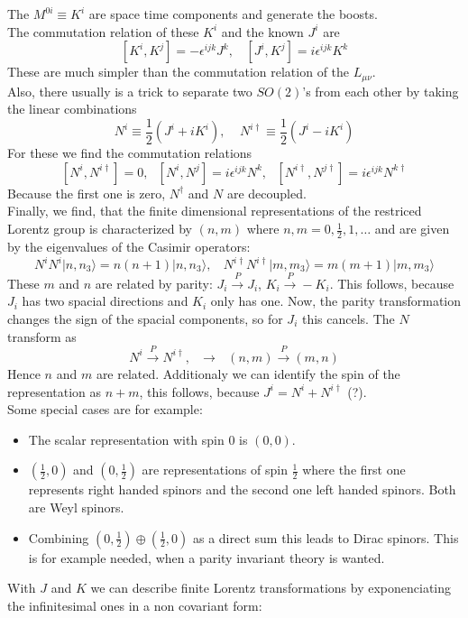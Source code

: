\documentclass{include/thesisclass}
\newcommand{\rk}{\rangle}
\newcommand{\df}{\rightarrow}
\newcommand{\eps}{\epsilon}
\begin{document}
The $M^{0i} \equiv K^i$ are space time components and generate the boosts.\\
The commutation relation of these $K^i$ and the known $J^i$ are
\[ [K^i, K^j] = - \eps^{ijk} J^k, ~~~~ [J^i, K^j] = i \eps^{ijk} K^k\]
These are much simpler than the commutation relation of the $L_{\mu\nu}$.\\
Also, there usually is a trick to separate two $SO(2)$'s from each other by taking the linear combinations
\[N^i \equiv \frac{1}{2}(J^i + i K^i), ~~~~~ N^{i\dagger} \equiv \frac{1}{2} ( J^i - i K^i)\]
For these we find the commutation relations
\[ [N^i, N^{i\dagger}] = 0, ~~~ [N^i, N^j] = i \eps^{ijk} N^k, ~~~ [N^{i\dagger}, N^{j\dagger}] = i \eps^{ijk} N^{k\dagger}\]
Because the first one is zero, $N^\dagger$ and $N$ are decoupled.\\
Finally, we find, that the finite dimensional representations of the restriced Lorentz group is characterized by $(n,m)$ where $n,m = 0,  \frac{1}{2}, 1, \ldots$ and are given by the eigenvalues of the Casimir operators:
\[N^iN^i|n,n_3\rk = n(n+1)|n,n_3\rk, ~~~~ N^{i\dagger}N^{i\dagger}|m,m_3\rk = m(m+1)|m,m_3\rk\]
These $m$ and $n$ are related by parity: $J_i \overset{P}{\df} J_i$, $K_i \overset{P}{\df} - K_i$. This follows, because $J_i$ has two spacial directions and $K_i$ only has one. Now, the parity transformation changes the sign of the spacial components, so for $J_i$ this cancels. The $N$ transform as
\[ N^i \overset{P}{\df} N^{i\dagger}, ~~~ \df ~~~ (n,m) \overset{P}{\df} (m,n)\]
Hence $n$ and $m$ are related. Additionaly we can identify the spin of the representation as $n+m$, this follows, because $J^i = N^i + N^{i\dagger}$ (?).\\
Some special cases are for example:
\begin{itemize}
\item The scalar representation with spin 0 is $(0,0)$.
\item $\left(\frac{1}{2}, 0\right)$ and $\left( 0, \frac{1}{2}\right)$ are representations of spin $\frac{1}{2}$ where the first one represents right handed spinors and the second one left handed spinors. Both are Weyl spinors.
\item Combining $\left(0, \frac{1}{2}\right)\oplus \left(\frac{1}{2}, 0 \right)$ as a direct sum this leads to Dirac spinors. This is for example needed, when a parity invariant theory is wanted.
\end{itemize}
With $J$ and $K$ we can describe finite Lorentz transformations by exponenciating the infinitesimal ones in a non covariant form:
\end{document}
